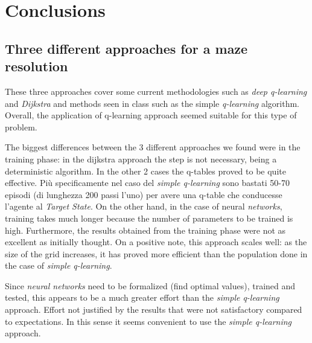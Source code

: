 \chapter*{Conclusions}
\fancyhf{}
\fancyfoot[LE,RO]{\large \thepage}

\section{Three different approaches for a maze resolution}

These three approaches cover some current methodologies such as \textit{deep q-learning} and \textit{Dijkstra} and methods seen in class such as the simple \textit{q-learning} algorithm. Overall, the application of q-learning approach seemed suitable for this type of problem.

The biggest differences between the 3 different approaches we found were in the training phase: in the dijkstra approach the step is not necessary, being a deterministic algorithm. In the other 2 cases the q-tables proved to be quite effective. Più specificamente nel caso del \textit{simple q-learning} sono bastati 50-70 episodi (di lunghezza 200 passi l'uno) per avere una q-table che conducesse l'agente al \textit{Target State}.
On the other hand, in the case of neural \textit{networks}, training takes much longer because the number of parameters to be trained is high. Furthermore, the results obtained from the training phase were not as excellent as initially thought. On a positive note, this approach scales well: as the size of the grid increases, it has proved more efficient than the population done in the case of \textit{simple q-learning}.

Since \textit{neural networks} need to be formalized (find optimal values), trained and tested, this appears to be a much greater effort than the \textit{simple q-learning} approach. Effort not justified by the results that were not satisfactory compared to expectations. In this sense it seems convenient to use the \textit{simple q-learning} approach.


